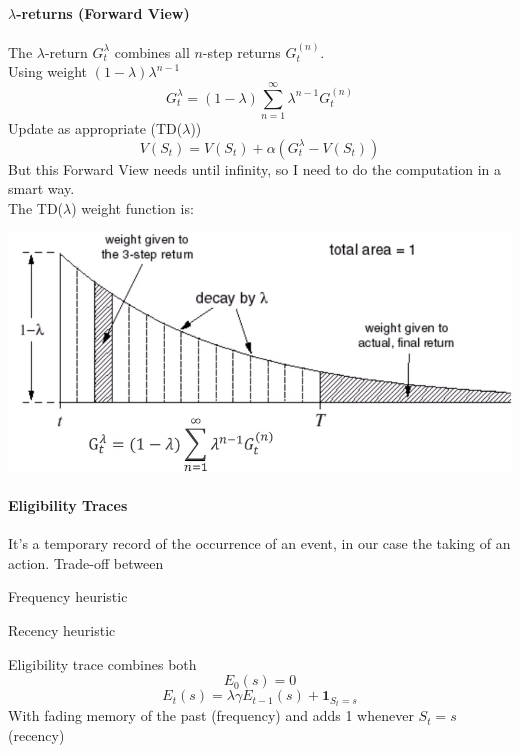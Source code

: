 \documentclass[10pt]{report}
\begin{document}
\paragraph{$\lambda$-returns (Forward View)} The $\lambda$-return $G_t^\lambda$ combines all $n$-step returns $G_t^{(n)}$.\\
Using weight $(1-\lambda)\lambda^{n-1}$
$$G_t^\lambda = (1-\lambda)\sum_{n=1}^\infty \lambda^{n-1}G_t^{(n)}$$
Update as appropriate (TD($\lambda$))
$$V(S_t) = V(S_t) + \alpha\left(G_t^\lambda - V(S_t)\right)$$
But this Forward View needs until infinity, so I need to do the computation in a smart way.\\
The TD($\lambda$) weight function is:
\begin{center}
	\includegraphics[scale=0.5]{170.png}
\end{center}
\paragraph{Eligibility Traces} It's a temporary record of the occurrence of an event, in our case the taking of an action. Trade-off between
\begin{list}{}{}
	\item Frequency heuristic
	\item Recency heuristic
\end{list}
Eligibility trace combines both
$$E_0(s) = 0$$
$$E_t(s) = \lambda\gamma E_{t-1}(s) + \mathbf{1}_{S_t=s}$$
With fading memory of the past (frequency) and adds 1 whenever $S_t = s$ (recency)
\end{document}
